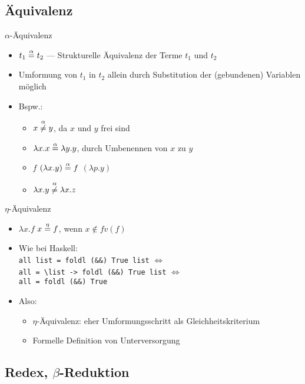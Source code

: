 \documentclass{beamer}
\begin{document}
\subsection{Äquivalenz}

\begin{frame}{$\alpha$-Äquivalenz}
	\begin{itemize}
		\item $t_1 \stackrel{\alpha}{=} t_2$ --- Strukturelle Äquivalenz der Terme $t_1$ und $t_2$
		\item Umformung von $t_1$ in $t_2$ allein durch Substitution der (gebundenen) Variablen möglich
		\pause
		\item Bspw.:
		\begin{itemize}
			\item $x \stackrel{\alpha}{\neq} y$, da $x$ und $y$ frei sind
			\item $\lambda{}x.x \stackrel{\alpha}{=} \lambda{}y.y$, durch Umbenennen von $x$ zu $y$
			\item $f$ $(\lambda{}x.y) \stackrel{\alpha}{=} f$ $(\lambda{}p.y)$
			\item $\lambda{}x.y \stackrel{\alpha}{\neq} \lambda{}x.z$
		\end{itemize}
	\end{itemize}
\end{frame}

\begin{frame}{$\eta$-Äquivalenz}
	\begin{itemize}
		\item $\lambda{}x.f$ $x \stackrel{\eta}{=} f$, wenn $x \notin fv(f)$
		\item Wie bei Haskell:\\
	              \texttt{all list = foldl (\&\&) True list} $\Leftrightarrow$\\
		      \texttt{all = \textbackslash{}list -> foldl (\&\&) True list} $\Leftrightarrow$\\
		      \texttt{all = foldl (\&\&) True}
		\item Also:
		\begin{itemize}
			\item $\eta$-Äquivalenz: eher Umformungsschritt als Gleichheitskriterium
			\item Formelle Definition von Unterversorgung
		\end{itemize}
	\end{itemize}
\end{frame}

\subsection{Redex, $\beta$-Reduktion}
\end{document}
